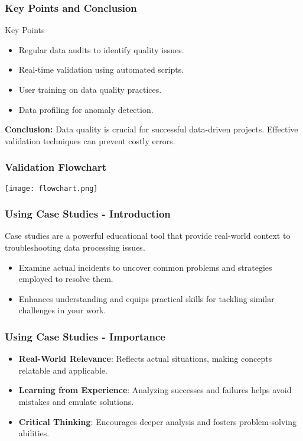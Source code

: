 \documentclass[aspectratio=169]{beamer}
\begin{document}
\begin{frame}
    \frametitle{Key Points and Conclusion}
    \begin{block}{Key Points}
        \begin{itemize}
            \item Regular data audits to identify quality issues.
            \item Real-time validation using automated scripts.
            \item User training on data quality practices.
            \item Data profiling for anomaly detection.
        \end{itemize}
    \end{block}
    
    \textbf{Conclusion:} Data quality is crucial for successful data-driven projects. Effective validation techniques can prevent costly errors.
\end{frame}

\begin{frame}
    \frametitle{Validation Flowchart}
    \texttt{[image: flowchart.png]} %
\end{frame}

\begin{frame}[fragile]
  \frametitle{Using Case Studies - Introduction}
  Case studies are a powerful educational tool that provide real-world context to troubleshooting data processing issues. 
  \begin{itemize}
    \item Examine actual incidents to uncover common problems and strategies employed to resolve them.
    \item Enhances understanding and equips practical skills for tackling similar challenges in your work.
  \end{itemize}
\end{frame}

\begin{frame}[fragile]
  \frametitle{Using Case Studies - Importance}
  \begin{itemize}
    \item \textbf{Real-World Relevance}: Reflects actual situations, making concepts relatable and applicable.
    \item \textbf{Learning from Experience}: Analyzing successes and failures helps avoid mistakes and emulate solutions.
    \item \textbf{Critical Thinking}: Encourages deeper analysis and fosters problem-solving abilities.
  \end{itemize}
\end{frame}
\end{document}
